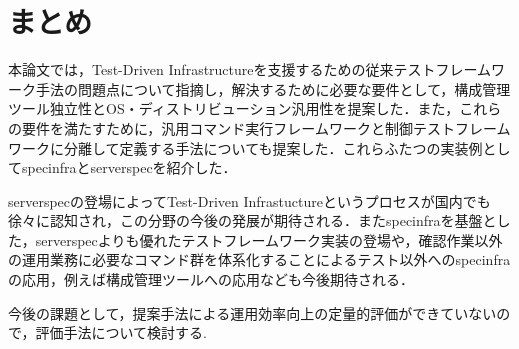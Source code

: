 \section{まとめ}

本論文では，Test-Driven Infrastructureを支援するための従来テストフレームワーク手法の問題点について指摘し，解決するために必要な要件として，構成管理ツール独立性とOS・ディストリビューション汎用性を提案した．また，これらの要件を満たすために，汎用コマンド実行フレームワークと制御テストフレームワークに分離して定義する手法についても提案した．これらふたつの実装例としてspecinfraとserverspecを紹介した．

serverspecの登場によってTest-Driven Infrastuctureというプロセスが国内でも徐々に認知され，この分野の今後の発展が期待される．またspecinfraを基盤とした，serverspecよりも優れたテストフレームワーク実装の登場や，確認作業以外の運用業務に必要なコマンド群を体系化することによるテスト以外へのspecinfraの応用，例えば構成管理ツールへの応用なども今後期待される．

今後の課題として，提案手法による運用効率向上の定量的評価ができていないので，評価手法について検討する.

